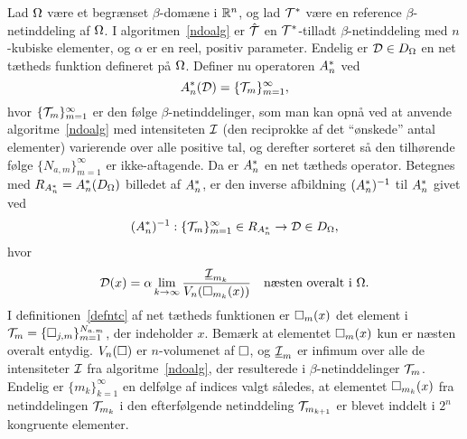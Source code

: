 \begin{theorem} \label{operator-net}
Lad $\Omega$ være et begrænset $\beta$-domæne i $\mathbb{R}^n$, og lad
$\mathcal T^{\ast}$ være en refe\-rence $\beta$-netinddeling af $\Omega$. I
algoritmen~\ref{ndoalg} er $\hat{\mathcal T}$ en $\mathcal T^{\ast}$-tilladt
$\beta$-netinddeling med $n$-kubiske elementer, og $\alpha$ er en
reel, positiv parameter. Endelig er ${\mathcal{D}}\in D_{\Omega}$ en net tætheds
funktion defineret på $\Omega$. Definer nu operatoren $A^{\ast}_n$ ved
\begin{equation}
  A^{\ast}_n ({\mathcal{D}} ) = \{ \mathcal T_m \}_{m=1}^\infty ,
\end{equation}
hvor $\{ \mathcal T_m \}_{m=1}^\infty$ er den følge $\beta$-netinddelinger,
som man kan opnå ved at anvende algoritme~\ref{ndoalg} med intensiteten $\mathcal I$
(den reciprokke af det ``ønskede'' antal elementer) varie\-rende over
alle positive tal, og derefter sorteret så den
tilhørende følge $\{N_{a,m}\}_{m=1}^\infty$ er ikke-aftagende. Da er
$A^{\ast}_n$ en net tætheds operator. Betegnes med $R_{A^{\ast}_n} = A^{\ast}_n(D_{\Omega})$
billedet af $A^{\ast}_n$, er den inverse afbildning $(A^{\ast}_n)^{-1}$ til $A^{\ast}_n$
givet ved
\begin{equation} \label{defndo}
  (A^{\ast}_n)^{-1} : \{ \mathcal T_m \}_{m=1}^\infty \in R_{A^{\ast}_n}
  \rightarrow {\mathcal{D}} \in D_{\Omega} ,
\end{equation}
hvor
\begin{equation} \label{defntc}
  {\mathcal{D}} (x) = \alpha \lim_{k\rightarrow\infty} 
  \frac{\underline{\mathcal I}_{m_k}}{V_n(\Box_{m_k}(x))} \quad \text{næsten overalt i $\Omega$.}
\end{equation}
I definitionen~\eqref{defntc} af net tætheds funktionen er $\Box_m(x)$ det
element i $\mathcal T_m =\{\Box_{j,m}\}_{m=1}^{N_{a.m}}$, der indeholder $x$.
Bemærk at elementet $\Box_m(x)$ kun er næsten
overalt entydig. $V_n(\Box )$ er $n$-volumenet af $\Box$, og
$\underline{\mathcal I}_m$ er infimum over alle de intensiteter $\mathcal I$ fra
algoritme~\ref{ndoalg}, der
resulterede i $\beta$-netinddelinger $\mathcal T_m$. Endelig er
$\{m_k\}_{k=1}^\infty$ en delfølge af indices valgt således, at
elementet $\Box_{m_k}(x)$ fra netinddelingen $\mathcal T_{m_k}$ i den efterfølgende netinddeling
$\mathcal T_{m_{k+1}}$ er blevet inddelt i $2^n$ kongruente elementer.   
\end{theorem}
\newlength{\len}
\settowidth{\len}{(3) }
